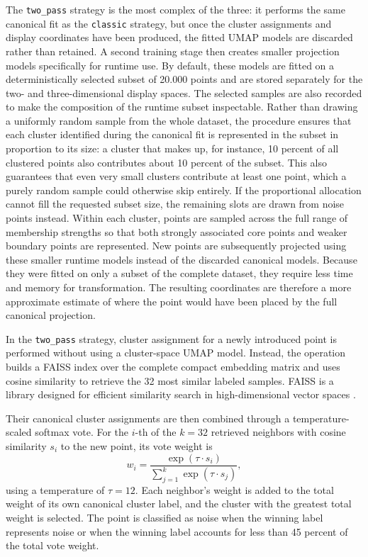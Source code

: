 The \texttt{two\_pass} strategy is the most complex of the three: it performs the same canonical fit as the \texttt{classic} strategy, but once the cluster assignments and display coordinates have been produced, the fitted UMAP models are discarded rather than retained.
A second training stage then creates smaller projection models specifically for runtime use. By default, these models are fitted on a deterministically selected subset of 20.000 points and are stored separately for the two- and three-dimensional display spaces. The selected samples are also recorded to make the composition of the runtime subset inspectable. Rather than drawing a uniformly random sample from the whole dataset, the procedure ensures that each cluster identified during the canonical fit is represented in the subset in proportion to its size: a cluster that makes up, for instance, 10 percent of all clustered points also contributes about 10 percent of the subset. This also guarantees that even very small clusters contribute at least one point, which a purely random sample could otherwise skip entirely. If the proportional allocation cannot fill the requested subset size, the remaining slots are drawn from noise points instead. Within each cluster, points are sampled across the full range of membership strengths so that both strongly associated core points and weaker boundary points are represented.
New points are subsequently projected using these smaller runtime models instead of the discarded canonical models. Because they were fitted on only a subset of the complete dataset, they require less time and memory for transformation. The resulting coordinates are therefore a more approximate estimate of where the point would have been placed by the full canonical projection.

In the \texttt{two\_pass} strategy, cluster assignment for a newly introduced point is performed without using a cluster-space UMAP model. Instead, the operation builds a FAISS index over the complete compact embedding matrix and uses cosine similarity to retrieve the 32 most similar labeled samples. FAISS is a library designed for efficient similarity search in high-dimensional vector spaces \cite{douze2025faisslibrary}.

Their canonical cluster assignments are then combined through a temperature-scaled softmax vote. For the $i$-th of the $k = 32$ retrieved neighbors with cosine similarity $s_i$ to the new point, its vote weight is
\[
w_i = \frac{\exp(\tau \cdot s_i)}{\sum_{j=1}^{k} \exp(\tau \cdot s_j)},
\]
using a temperature of $\tau = 12$. Each neighbor's weight is added to the total weight of its own canonical cluster label, and the cluster with the greatest total weight is selected. The point is classified as noise when the winning label represents noise or when the winning label accounts for less than 45 percent of the total vote weight.

